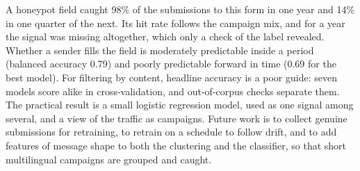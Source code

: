 \documentclass[conference]{IEEEtran}
\begin{document}
A honeypot field caught 98\% of the submissions to this form in one year and 14\% in one quarter of the next.
Its hit rate follows the campaign mix, and for a year the signal was missing altogether, which only a check of
the label revealed. Whether a sender fills the field is moderately predictable inside a period (balanced
accuracy 0.79) and poorly predictable forward in time (0.69 for the best model). For filtering by content,
headline accuracy is a poor guide: seven models score alike in cross-validation, and out-of-corpus checks
separate them. The practical result is a small logistic regression model, used as one signal among several,
and a view of the traffic as campaigns. Future work is to collect genuine submissions for retraining, to
retrain on a schedule to follow drift, and to add features of message shape to both the clustering and the
classifier, so that short multilingual campaigns are grouped and caught.
\end{document}
